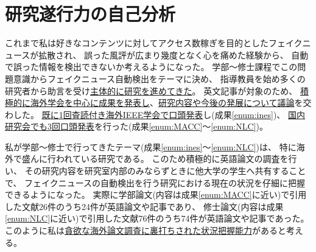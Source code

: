 
\section{研究遂行力の自己分析}

\noindent
{}

これまで私は好きなコンテンツに対してアクセス数稼ぎを目的としたフェイクニュースが拡散され、
誤った風評が広まり幾度となく心を痛めた経験から、
自動で誤った情報を検出できないか考えるようになった。
学部〜修士課程でこの問題意識からフェイクニュース自動検出をテーマに決め、
指導教員を始め多くの研究者から助言を受け\underline{主体的に研究を進めてきた}。
英文記事が対象のため、
\underline{積極的に海外学会を中心に成果を発表し}、\underline{研究内容や今後の発展について議論}を交わした。
\underline{既に1回査読付き海外IEEE学会で口頭発表}し(成果\ref{enum:ines})、
\underline{国内研究会でも3回口頭発表}を行った(成果\ref{enum:MACC}〜\ref{enum:NLC})。

私が学部〜修士で行ってきたテーマ(成果\ref{enum:ines}〜\ref{enum:NLC})は、
特に海外で盛んに行われている研究である。
このため積極的に英語論文の調査を行い、
その研究内容を研究室内部のみならずときに他大学の学生へ共有することで、
フェイクニュースの自動検出を行う研究における現在の状況を仔細に把握できるようになった。
実際に学部論文(内容は成果\ref{enum:MACC}に近い)で引用した文献26件のうち24件が英語論文や記事であり、
修士論文(内容は成果\ref{enum:NLC}に近い)で引用した文献76件のうち74件が英語論文や記事であった。
このように私は\underline{貪欲な海外論文調査に裏打ちされた状況把握能力}があると考える。

